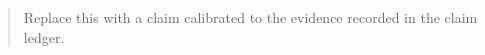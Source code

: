 \begin{abstract}
Replace this with a claim calibrated to the evidence recorded in the claim ledger.
\end{abstract}
